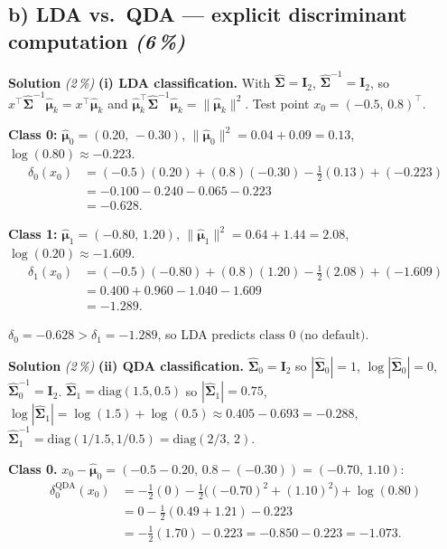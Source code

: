 \documentclass[11pt,a4paper]{article}
\newcommand{\subpoints}[1]{\textit{(#1\,\%)}}
\newcommand{\sol}{\noindent\textbf{Solution}}
\begin{document}
\subsection*{b) LDA vs.\ QDA --- explicit discriminant computation \subpoints{6}}

\sol{} \subpoints{2} \textbf{(i) LDA classification.} With $\hat{\bm\Sigma} = \mathbf I_2$,
$\hat{\bm\Sigma}^{-1} = \mathbf I_2$, so $x^\top\hat{\bm\Sigma}^{-1}\hat{\bm\mu}_k = x^\top\hat{\bm\mu}_k$
and $\hat{\bm\mu}_k^\top\hat{\bm\Sigma}^{-1}\hat{\bm\mu}_k = \|\hat{\bm\mu}_k\|^2$.
Test point $x_0 = (-0.5,\, 0.8)^\top$.

\textbf{Class 0:} $\hat{\bm\mu}_0 = (0.20,\, -0.30)$, $\|\hat{\bm\mu}_0\|^2 = 0.04 + 0.09 = 0.13$,
$\log(0.80) \approx -0.223$.
\begin{align*}
\delta_0(x_0) &= (-0.5)(0.20) + (0.8)(-0.30) - \tfrac{1}{2}(0.13) + (-0.223) \\
   &= -0.100 - 0.240 - 0.065 - 0.223 \\
   &= \boxed{-0.628}.
\end{align*}

\textbf{Class 1:} $\hat{\bm\mu}_1 = (-0.80,\, 1.20)$, $\|\hat{\bm\mu}_1\|^2 = 0.64 + 1.44 = 2.08$,
$\log(0.20) \approx -1.609$.
\begin{align*}
\delta_1(x_0) &= (-0.5)(-0.80) + (0.8)(1.20) - \tfrac{1}{2}(2.08) + (-1.609) \\
   &= 0.400 + 0.960 - 1.040 - 1.609 \\
   &= \boxed{-1.289}.
\end{align*}

$\delta_0 = -0.628 > \delta_1 = -1.289$, so LDA predicts $\boxed{\text{class } 0 \text{ (no default)}}$.

\medskip
\sol{} \subpoints{2} \textbf{(ii) QDA classification.}
$\hat{\bm\Sigma}_0 = \mathbf I_2$ so $|\hat{\bm\Sigma}_0| = 1$, $\log|\hat{\bm\Sigma}_0| = 0$,
$\hat{\bm\Sigma}_0^{-1} = \mathbf I_2$.
$\hat{\bm\Sigma}_1 = \mathrm{diag}(1.5, 0.5)$ so $|\hat{\bm\Sigma}_1| = 0.75$,
$\log|\hat{\bm\Sigma}_1| = \log(1.5) + \log(0.5) \approx 0.405 - 0.693 = -0.288$,
$\hat{\bm\Sigma}_1^{-1} = \mathrm{diag}(1/1.5, 1/0.5) = \mathrm{diag}(2/3,\, 2)$.

\textbf{Class 0.} $x_0 - \hat{\bm\mu}_0 = (-0.5 - 0.20,\, 0.8 - (-0.30)) = (-0.70,\, 1.10)$:
\begin{align*}
\delta_0^{\text{QDA}}(x_0) &= -\tfrac{1}{2}(0) - \tfrac{1}{2}\bigl((-0.70)^2 + (1.10)^2\bigr) + \log(0.80) \\
   &= 0 - \tfrac{1}{2}(0.49 + 1.21) - 0.223 \\
   &= -\tfrac{1}{2}(1.70) - 0.223 = -0.850 - 0.223 = \boxed{-1.073}.
\end{align*}
\end{document}
